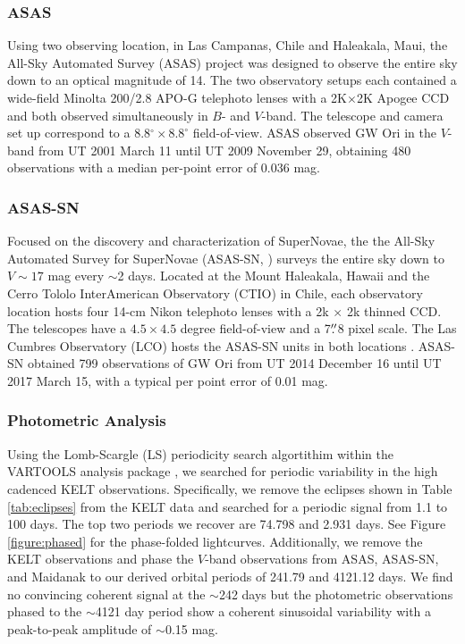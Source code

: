 \documentclass[twocolumn]{aastex61}
\begin{document}
\subsubsection{ASAS}
Using two observing location, in Las Campanas, Chile and Haleakala, Maui, the All-Sky Automated Survey (ASAS) project was designed to observe the entire sky down to an optical magnitude of 14. The two observatory setups each contained a wide-field Minolta 200/2.8 APO-G telephoto lenses with a 2K$\times$2K Apogee CCD and both observed simultaneously in $B$- and $V$-band. The telescope and camera set up correspond to a 8.8$^{\circ}\times8.8^{\circ}$ field-of-view. ASAS observed GW Ori in the $V$-band from UT 2001 March 11 until UT 2009 November 29, obtaining 480 observations with a median per-point error of 0.036 mag.

\subsubsection{ASAS-SN}
Focused on the discovery and characterization of SuperNovae, the the All-Sky Automated Survey for SuperNovae (ASAS-SN, \citet{Shappee14}) surveys the entire sky down to $V \sim 17$ mag every $\sim$2 days. Located at the Mount Haleakala, Hawaii and the Cerro Tololo InterAmerican Observatory (CTIO) in Chile, each observatory location hosts four 14-cm Nikon telephoto lenses with a 2k $\times$ 2k thinned CCD. The telescopes have a $4.5\times4.5$ degree field-of-view and a 7$\mbox{$.\!\!^{\prime\prime}$}$8 pixel scale. The Las Cumbres Observatory (LCO) hosts the ASAS-SN units in both locations \citep{Brown13}. ASAS-SN obtained 799 observations of GW Ori from UT 2014 December 16 until UT 2017 March 15, with a typical per point error of 0.01 mag.

\subsubsection{Photometric Analysis}
Using the Lomb-Scargle (LS) periodicity search algortithim \citep{Lomb76,Scargle82} within the VARTOOLS analysis package \citep{Hartman:12}, we searched for periodic variability in the high cadenced KELT observations. Specifically, we remove the eclipses shown in Table \ref{tab:eclipses} from the KELT data and searched for a periodic signal from 1.1 to 100 days. The top two periods we recover are 74.798 and 2.931 days. See Figure \ref{figure:phased} for the phase-folded lightcurves. Additionally, we remove the KELT observations and phase the $V$-band observations from ASAS, ASAS-SN, and Maidanak to our derived orbital periods of 241.79 and 4121.12 days. We find no convincing coherent signal at the $\sim$242 days but the photometric observations phased to the $\sim$4121 day period show a coherent sinusoidal variability with a peak-to-peak amplitude of $\sim$0.15 mag.
\end{document}
